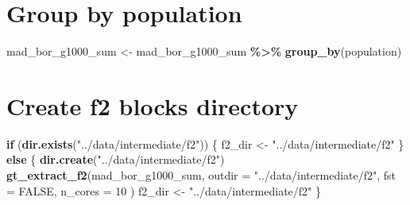\documentclass[
]{article}
\newenvironment{Shaded}{\begin{snugshade}}{\end{snugshade}}
\newcommand{\AttributeTok}[1]{\textcolor[rgb]{0.13,0.29,0.53}{#1}}
\newcommand{\ConstantTok}[1]{\textcolor[rgb]{0.56,0.35,0.01}{#1}}
\newcommand{\ControlFlowTok}[1]{\textcolor[rgb]{0.13,0.29,0.53}{\textbf{#1}}}
\newcommand{\DecValTok}[1]{\textcolor[rgb]{0.00,0.00,0.81}{#1}}
\newcommand{\FunctionTok}[1]{\textcolor[rgb]{0.13,0.29,0.53}{\textbf{#1}}}
\newcommand{\NormalTok}[1]{#1}
\newcommand{\OtherTok}[1]{\textcolor[rgb]{0.56,0.35,0.01}{#1}}
\newcommand{\SpecialCharTok}[1]{\textcolor[rgb]{0.81,0.36,0.00}{\textbf{#1}}}
\newcommand{\StringTok}[1]{\textcolor[rgb]{0.31,0.60,0.02}{#1}}
\begin{document}
\begin{Shaded}
\end{Shaded}

\section{Group by population}\label{group-by-population}

\begin{Shaded}
\begin{Highlighting}[]
\NormalTok{mad\_bor\_g1000\_sum }\OtherTok{\textless{}{-}}\NormalTok{ mad\_bor\_g1000\_sum }\SpecialCharTok{\%\textgreater{}\%} \FunctionTok{group\_by}\NormalTok{(population)}
\end{Highlighting}
\end{Shaded}

\section{Create f2 blocks directory}\label{create-f2-blocks-directory}

\begin{Shaded}
\begin{Highlighting}[]
\ControlFlowTok{if}\NormalTok{ (}\FunctionTok{dir.exists}\NormalTok{(}\StringTok{"../data/intermediate/f2"}\NormalTok{)) \{}
\NormalTok{  f2\_dir }\OtherTok{\textless{}{-}} \StringTok{"../data/intermediate/f2"}
\NormalTok{\} }\ControlFlowTok{else}\NormalTok{ \{}
  \FunctionTok{dir.create}\NormalTok{(}\StringTok{"../data/intermediate/f2"}\NormalTok{)}
  \FunctionTok{gt\_extract\_f2}\NormalTok{(mad\_bor\_g1000\_sum,}
    \AttributeTok{outdir =} \StringTok{"../data/intermediate/f2"}\NormalTok{,}
    \AttributeTok{fst =} \ConstantTok{FALSE}\NormalTok{,}
    \AttributeTok{n\_cores =} \DecValTok{10}
\NormalTok{  )}
\NormalTok{  f2\_dir }\OtherTok{\textless{}{-}} \StringTok{"../data/intermediate/f2"}
\NormalTok{\}}
\end{Highlighting}
\end{Shaded}
\end{document}
